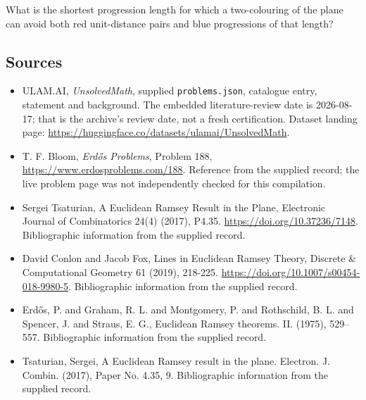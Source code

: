 \documentclass[11pt,a4paper]{article}
\begin{document}
What is the shortest progression length for which a two-colouring of the plane can avoid both red unit-distance pairs and blue progressions of that length?

\subsection{Sources}

{\small

\begin{itemize}

\item[\hypertarget{source:statement:1}{S1}] ULAM.AI, \emph{UnsolvedMath}, supplied \texttt{problems.json}, catalogue entry, statement and background. The embedded literature-review date is 2026-08-17; that is the archive’s review date, not a fresh certification. Dataset landing page: \url{https://huggingface.co/datasets/ulamai/UnsolvedMath}.

\item[\hypertarget{source:statement:2}{S2}] T. F. Bloom, \emph{Erdős Problems}, Problem 188, \url{https://www.erdosproblems.com/188}. Reference from the supplied record; the live problem page was not independently checked for this compilation.

\item[\hypertarget{source:statement:3}{S3}] Sergei Tsaturian, A Euclidean Ramsey Result in the Plane, Electronic Journal of Combinatorics 24(4) (2017), P4.35. \url{https://doi.org/10.37236/7148}. Bibliographic information from the supplied record.

\item[\hypertarget{source:statement:4}{S4}] David Conlon and Jacob Fox, Lines in Euclidean Ramsey Theory, Discrete \& Computational Geometry 61 (2019), 218-225. \url{https://doi.org/10.1007/s00454-018-9980-5}. Bibliographic information from the supplied record.

\item[\hypertarget{source:statement:5}{S5}] Erd\H{o}s, P. and Graham, R. L. and Montgomery, P. and Rothschild, B. L. and Spencer, J. and Straus, E. G., Euclidean {R}amsey theorems. {II}. (1975), 529--557. Bibliographic information from the supplied record.

\item[\hypertarget{source:statement:6}{S6}] Tsaturian, Sergei, A {E}uclidean {R}amsey result in the plane. Electron. J. Combin. (2017), Paper No. 4.35, 9. Bibliographic information from the supplied record.

\end{itemize}

}

\label{end:statement}
\end{document}
